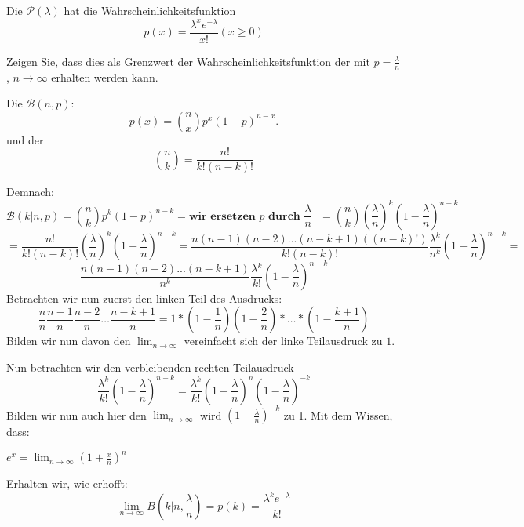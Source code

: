 \begin{uebsp}
\begin{Exercise}[label=ex:2.1]

    Die  $\mathcal P(\lambda)$ hat die Wahrscheinlichkeitsfunktion \\

    \[p\left(x\right)=\frac{{\lambda }^{x}{e}^{-\lambda}}{x!}\left(x\geq 0\right)\]
 
Zeigen Sie, dass dies als Grenzwert der Wahrscheinlichkeitsfunktion der
 mit $p = \frac{\lambda}{n}$, $ n \rightarrow \infty$ erhalten werden kann. \\



\end{Exercise}
\begin{Answer}
\begin{uebsp_theory} 
Die  $\mathcal B(n,p)$:
\[p(x)={n\choose x}p^x(1-p)^{n-x}.\]
und der 
\[{n\choose k} = \frac{n!}{k!(n-k)!}\]
\end{uebsp_theory}

Demnach: \\

\[\mathcal B(k | n,p) = {n\choose k}p^k(1-p)^{n-k} = \textbf{wir ersetzen $p$ durch $\frac{\lambda}{n}$ } = {n\choose k}(\frac{\lambda}{n})^k(1-\frac{\lambda}{n})^{n-k}\]
\[=\frac{n!}{k!(n-k)!} (\frac{\lambda}{n})^k(1-\frac{\lambda}{n})^{n-k} = \frac{n(n-1)(n-2)...(n-k+1)((n-k)!)}{k!(n-k)!}\frac{\lambda{^k}}{n^{k}}(1-\frac{\lambda}{n})^{n-k} =\]
\[\frac{n(n-1)(n-2)...(n-k+1)}{n^{k}}\frac{\lambda{^k}}{k!}(1-\frac{\lambda}{n})^{n-k}\]
Betrachten wir nun zuerst den linken Teil des Ausdrucks: 
\[\frac{n}{n}\frac{n-1}{n}\frac{n-2}{n}\dots \frac{n-k+1}{n} = 1*(1-\frac{1}{n})(1-\frac{2}{n}) * \dots * (1-\frac{k+1}{n})\]
Bilden wir nun davon den $\lim_{n \to \infty}$ vereinfacht sich der linke Teilausdruck zu $1$.

Nun betrachten wir den verbleibenden rechten Teilausdruck
\[\frac{\lambda^{k}}{k!}(1-\frac{\lambda}{n})^{n-k} = \frac{\lambda^{k}}{k!}(1-\frac{\lambda}{n})^{n} (1-\frac{\lambda}{n})^{-k}\]
Bilden wir nun auch hier den $\lim_{n \to \infty}$ wird $(1-\frac{\lambda}{n})^{-k}$ zu 1. Mit dem Wissen, dass:
\begin{uebsp_theory} 
$e^{x} = \lim_{n \to \infty}(1+\frac{x}{n})^{n}$
\end{uebsp_theory}

Erhalten wir, wie erhofft:
\[\lim_{n \to \infty} B(k | n,\frac{\lambda}{n}) = p\left(k\right)=\frac{{\lambda }^{k}{e}^{-\lambda}}{k!}\]
\end{Answer}
\end{uebsp}
